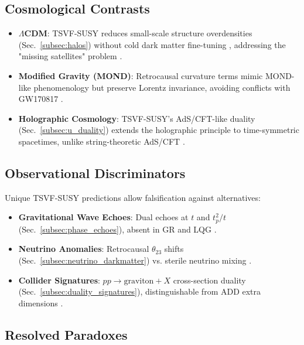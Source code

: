 \documentclass[twocolumn,superscriptaddress,floatfix]{revtex4-2}
\begin{document}
\subsection{Cosmological Contrasts}
\label{subsec:cosmo_comparison}

\begin{itemize}
\item \textbf{\(\Lambda\)CDM}: TSVF-SUSY reduces small-scale structure overdensities (Sec.~\ref{subsec:halos}) without cold dark matter fine-tuning \cite{Bullock2017}, addressing the "missing satellites" problem \cite{Klypin1999}.  
\item \textbf{Modified Gravity (MOND)}: Retrocausal curvature terms mimic MOND-like phenomenology \cite{McGaugh2016} but preserve Lorentz invariance, avoiding conflicts with GW170817 \cite{Ezquiaga2018}.  
\item \textbf{Holographic Cosmology}: TSVF-SUSY's AdS/CFT-like duality (Sec.~\ref{subsec:u_duality}) extends the holographic principle \cite{Bousso2002} to time-symmetric spacetimes, unlike string-theoretic AdS/CFT \cite{Maldacena1999}.  
\end{itemize}

\subsection{Observational Discriminators}
\label{subsec:discriminators}

Unique TSVF-SUSY predictions allow falsification against alternatives:
\begin{itemize}
\item \textbf{Gravitational Wave Echoes}: Dual echoes at \( t \) and \( t_p^2/t \) (Sec.~\ref{subsec:phase_echoes}), absent in GR and LQG \cite{Abedi2017}.  
\item \textbf{Neutrino Anomalies}: Retrocausal \( \theta_{23} \) shifts (Sec.~\ref{subsec:neutrino_darkmatter}) vs. sterile neutrino mixing \cite{Dentler2018}.  
\item \textbf{Collider Signatures}: \( pp \to \text{graviton} + X \) cross-section duality (Sec.~\ref{subsec:duality_signatures}), distinguishable from ADD extra dimensions \cite{ArkaniHamed1998}.  
\end{itemize}

\subsection{Resolved Paradoxes}
\label{subsec:paradoxes}
\end{document}
